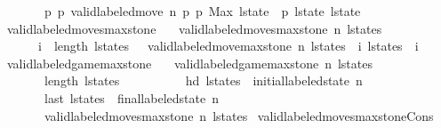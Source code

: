 \begin{isabellebody}
\ \ \ \ \ \ {\isacharparenleft}{\isasymexists}\ p{}\ p{}{\isachardot}\ valid{\isacharunderscore}labeled{\isacharunderscore}move{\isacharprime}\ n\ p{}\ p{}\ {\isacharparenleft}Max\ {\isacharparenleft}l{\isacharunderscore}state\ {\isacharbang}\ p{}{\isacharparenright}{\isacharparenright}\ l{\isacharunderscore}state\ l{\isacharunderscore}state{\isacharprime}{\isacharparenright}{\isachardoublequoteclose}\isanewline
\isanewline
{}\isamarkupfalse%
\ valid{\isacharunderscore}labeled{\isacharunderscore}moves{\isacharunderscore}max{\isacharunderscore}stone\ \isanewline
\ \ {\isachardoublequoteopen}valid{\isacharunderscore}labeled{\isacharunderscore}moves{\isacharunderscore}max{\isacharunderscore}stone\ n\ l{\isacharunderscore}states\ {\isasymlongleftrightarrow}\ \isanewline
\ \ \ \ \ {\isacharparenleft}{\isasymforall}\ i\ {\isacharless}\ length\ l{\isacharunderscore}states\ {\isacharminus}\ {}{\isachardot}\ valid{\isacharunderscore}labeled{\isacharunderscore}move{\isacharunderscore}max{\isacharunderscore}stone\ n\ {\isacharparenleft}l{\isacharunderscore}states\ {\isacharbang}\ i{\isacharparenright}\ {\isacharparenleft}l{\isacharunderscore}states\ {\isacharbang}\ {\isacharparenleft}i\ {\isacharplus}\ {}{\isacharparenright}{\isacharparenright}{\isacharparenright}{\isachardoublequoteclose}\isanewline
\isanewline
{}\isamarkupfalse%
\ valid{\isacharunderscore}labeled{\isacharunderscore}game{\isacharunderscore}max{\isacharunderscore}stone\ \isanewline
\ \ {\isachardoublequoteopen}valid{\isacharunderscore}labeled{\isacharunderscore}game{\isacharunderscore}max{\isacharunderscore}stone\ n\ l{\isacharunderscore}states\ {\isasymlongleftrightarrow}\ \isanewline
\ \ \ \ \ \ \ length\ l{\isacharunderscore}states\ {\isasymge}\ {}\ {\isasymand}\isanewline
\ \ \ \ \ \ \ hd\ l{\isacharunderscore}states\ {\isacharequal}\ initial{\isacharunderscore}labeled{\isacharunderscore}state\ n\ {\isasymand}\ \isanewline
\ \ \ \ \ \ \ last\ l{\isacharunderscore}states\ {\isacharequal}\ final{\isacharunderscore}labeled{\isacharunderscore}state\ n\ {\isasymand}\ \isanewline
\ \ \ \ \ \ \ valid{\isacharunderscore}labeled{\isacharunderscore}moves{\isacharunderscore}max{\isacharunderscore}stone\ n\ l{\isacharunderscore}states{\isachardoublequoteclose}\isanewline
\isanewline
{}\isamarkupfalse%
\ valid{\isacharunderscore}labeled{\isacharunderscore}moves{\isacharunderscore}max{\isacharunderscore}stone{\isacharunderscore}Cons{\isacharcolon}\isanewline

\end{isabellebody}
